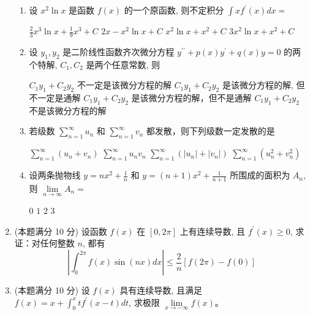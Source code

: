 \begin{enumerate}
\begin{enumerate}
\item 
设 $x^{2} \ln x$ 是函数 $f(x)$ 的一个原函数, 则不定积分 $\int x f^{\prime}(x) d x=$  


\fourchoices
{$\frac{2}{3} x^{3} \ln x+\frac{1}{9} x^{3}+C$}
{$2 x-x^{2} \ln x+C$}
{$x^{2} \ln x+x^{2}+C$}
{$3 x^{2} \ln x+x^{2}+C$}

\item 
设 $y_{1}, y_{2}$ 是二阶线性函数齐次微分方程 $y^{\prime \prime}+p(x) y^{\prime}+q(x) y=0$ 的两个特解, $C_{1}, C_{2}$ 是两个任意常数, 则  


\fourchoices
{$C_{1} y_{1}+C_{2} y_{2}$ 不一定是该微分方程的解}
{$C_{1} y_{1}+C_{2} y_{2}$ 是该微分方程的解, 但不一定是通解}
{$C_{1} y_{1}+C_{2} y_{2}$ 是该微分方程的解，但不是通解}
{$C_{1} y_{1}+C_{2} y_{2}$ 不是该微分方程的解}

\item 
若级数 $\sum\limits_{n=1}^{\infty} u_{n}$ 和 $\sum\limits_{n=1}^{\infty} v_{n}$ 都发散，则下列级数一定发散的是  


\fourchoices
{$\sum\limits_{n=1}^{\infty}\left(u_{n}+v_{n}\right)$}
{$\sum\limits_{n=1}^{\infty} u_{n} v_{n}$}
{$\sum\limits_{n=1}^{\infty}\left(\left|u_{n}\right|+\left|v_{n}\right|\right)$}
{$\sum\limits_{n=1}^{\infty}\left(u_{n}^{2}+v_{n}^{2}\right)$}

\item 
设两条抛物线 $y=n x^{2}+\frac{1}{n}$ 和 $y=(n+1) x^{2}+\frac{1}{n+1}$ 所围成的面积为 $A_{n}$, 则 $\lim\limits _{n \rightarrow \infty} A_{n}=$ 



\fourchoices
{$ 0 $}
{$ 1 $}
{$ 2 $}
{$ 3 $}


		
	\end{enumerate}
	
\item 
(本题满分 10 分)	
设函数 $f(x)$ 在 $[0,2 \pi]$ 上有连续导数, 且 $f^{\prime}(x) \geqslant 0$, 求证：对任何整数 $n$, 都有
\[
\left|\int_{0}^{2 \pi} f(x) \sin (nx) d x\right| \leqslant \frac{2}{n} \left[ f(2 \pi)-f(0)\right]
\]





\item 
(本题满分 10 分)
设 $f(x)$ 具有连续导数, 且满足 $f(x)=x+\int_{0}^{x} t f^{\prime}(x-t) d t$, 求极限 $\lim\limits _{x \rightarrow-\infty} f(x)$。





\end{enumerate}
